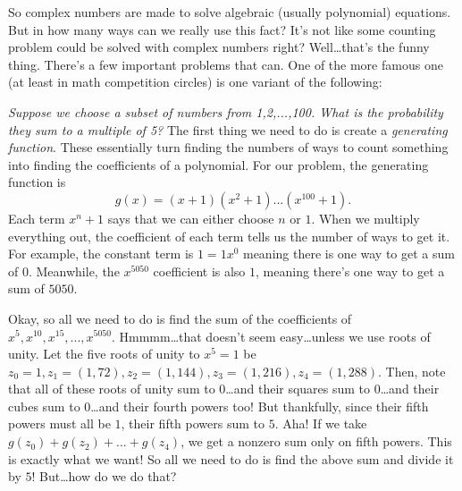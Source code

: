 \documentclass{article}
\begin{document}
So complex numbers are made to solve algebraic (usually polynomial) equations. But in how many ways can we really use this fact? It’s not like some counting problem could be solved with complex numbers right? Well…that’s the funny thing. There’s a few important problems that can. One of the more famous one (at least in math competition circles) is one variant of the following:

\textit{Suppose we choose a subset of numbers from {1,2,...,100}. What is the probability they sum to a multiple of 5?} The first thing we need to do is create a \textit{generating function}. These essentially turn finding the numbers of ways to count something into finding the coefficients of a polynomial. For our problem, the generating function is 
$$g(x)=(x+1)(x^2+1)...(x^{100}+1).$$ 
Each term $x^n+1$ says that we can either choose $n$ or $1$. When we multiply everything out, the coefficient of each term tells us the number of ways to get it. For example, the constant term is $1=1x^0$ meaning there is one way to get a sum of $0$. Meanwhile, the $x^{5050}$ coefficient is also $1$, meaning there’s one way to get a sum of $5050$. 

Okay, so all we need to do is find the sum of the coefficients of $x^5,x^{10},x^{15},...,x^{5050}$. Hmmmm…that doesn’t seem easy…unless we use roots of unity. Let the five roots of unity to $x^5=1$ be $z_0=1, z_1=(1,72), z_2=(1,144), z_3=(1,216), z_4=(1,288)$. Then, note that all of these roots of unity sum to $0$…and their squares sum to $0$…and their cubes sum to $0$…and their fourth powers too! But thankfully, since their fifth powers must all be $1$, their fifth powers sum to $5$. Aha! If we take $g(z_0)+g(z_2)+...+g(z_4)$, we get a nonzero sum only on fifth powers. This is exactly what we want! So all we need to do is find the above sum and divide it by $5$! But…how do we do that? 
	
\end{document}
